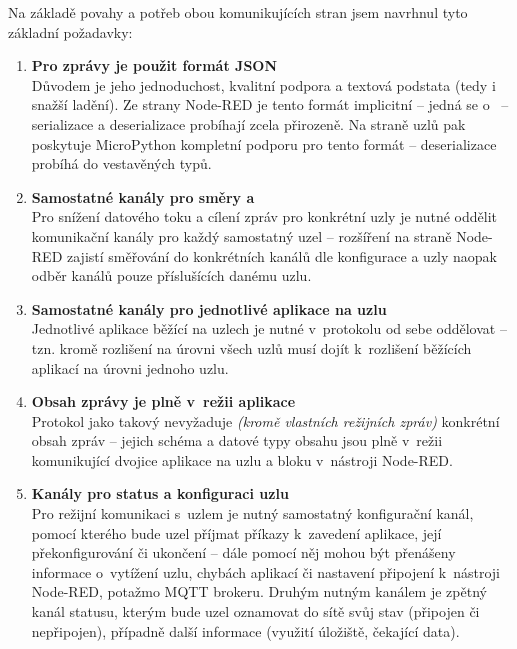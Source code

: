 Na základě povahy a potřeb obou komunikujících stran jsem navrhnul tyto základní požadavky:
\begin{enumerate}
    \item \textbf{Pro zprávy je použit formát JSON} \\
    Důvodem je jeho jednoduchost, kvalitní podpora a textová podstata (tedy i snažší ladění).
    Ze strany Node-RED je tento formát implicitní -- jedná se o~ -- serializace a
    deserializace probíhají zcela přirozeně.
    Na straně uzlů pak poskytuje MicroPython kompletní podporu pro tento formát -- deserializace probíhá do
    vestavěných typů.

    \item \textbf{Samostatné kanály pro směry  a } \\
    Pro snížení datového toku a cílení zpráv pro konkrétní uzly je nutné oddělit komunikační kanály pro každý
    samostatný uzel -- rozšíření na straně Node-RED zajistí směřování do konkrétních kanálů dle konfigurace a uzly
    naopak odběr kanálů pouze příslušících danému uzlu.

    \item \textbf{Samostatné kanály pro jednotlivé aplikace na uzlu} \\
    Jednotlivé aplikace běžící na uzlech je nutné v~protokolu od sebe oddělovat -- tzn. kromě rozlišení na úrovni
    všech uzlů musí dojít k~rozlišení běžících aplikací na úrovni jednoho uzlu.

    \item \textbf{Obsah zprávy je plně v~režii aplikace} \\
    Protokol jako takový nevyžaduje \emph{(kromě vlastních režijních zpráv)} konkrétní obsah zpráv -- jejich schéma a
    datové typy obsahu jsou plně v~režii komunikující dvojice aplikace na uzlu a bloku v~nástroji Node-RED.

    \item \textbf{Kanály pro status a konfiguraci uzlu} \\
    Pro režijní komunikaci s~uzlem je nutný samostatný konfigurační kanál, pomocí kterého bude uzel příjmat příkazy
    k~zavedení aplikace, její překonfigurování či ukončení -- dále pomocí něj mohou být přenášeny informace o~vytížení
    uzlu, chybách aplikací či nastavení připojení k~nástroji Node-RED, potažmo MQTT brokeru.
    Druhým nutným kanálem je zpětný kanál statusu, kterým bude uzel oznamovat do sítě svůj stav (připojen či
    nepřipojen), případně další informace (využití úložiště, čekající data).
\end{enumerate}

